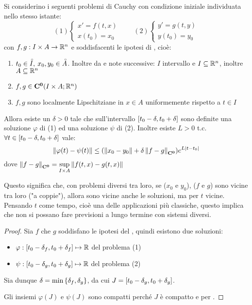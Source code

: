 \begin{theorem}
	\label{teo:cau_locale_part_2}
	Si considerino i seguenti problemi di Cauchy con condizione iniziale individuata nello stesso istante:
	$$(1)\begin{cases}x'=f(t,x)\\x(t_0)=x_0\end{cases}\qquad
	(2)\begin{cases}y'=g(t,y)\\y(t_0)=y_0\end{cases}$$
	con $f,g:I\times A \to \mathbb{R}^n$ e soddisfacenti le ipotesi di , cioè:
	\begin{enumerate}
		\item $t_0\in \accentset{\circ}{I},\:x_0,y_0\in \accentset{\circ}{A}$. Inoltre da  e note successive: $I$ intervallo e $I\subseteq \mathbb{R}^n$, inoltre $A\subseteq \mathbb{R}^n$
		\item $f,g\in \mathbf{C^{0}}(I\times A; \mathbb{R}^n)$
		\item $f,g$ sono localmente Lipschitziane in $x\in A$ uniformemente rispetto a $t\in I$
	\end{enumerate}
	Allora esiste un $\delta >0$ tale che sull'intervallo $\left[t_0-\delta,t_0+\delta\right]$ sono definite una soluzione $\varphi$ di (1) ed una soluzione $\psi$ di (2). Inoltre esiste $L>0$ t.c. $\forall t\in \left[t_0-\delta,t_0+\delta\right]$ vale:
	$$\left\|\varphi(t)-\psi(t)\right\| \le (\left\|x_0-y_0\right\|+\delta\left\|f-g\right\|_{\mathbf{C^{0}}})e^{L\left|t-t_0\right|}$$
	dove $\left\|f-g\right\|_{\mathbf{C^{0}}}=\sup\limits_{I\times A}\left\|f(t,x)-g(t,x)\right\|$
	\begin{note}
		Questo significa che, con problemi diversi tra loro, se ($x_0$ e $y_0$), ($f$ e $g$) sono vicine tra loro ("a coppie"), allora sono vicine anche le soluzioni, ma per $t$ vicine.
		Pensando $t$ come tempo, cioè una delle applicazioni più classiche, questo implica che non si possano fare previsioni a lungo termine con sistemi diversi.
	\end{note}
	\begin{proof}
		Sia $f$ che $g$ soddisfano le ipotesi del , quindi esistono due soluzioni:
		\begin{itemize}
			\item $\varphi:\left[t_0-\delta_f,t_0+\delta_f\right]\mapsto\mathbb{R}$ del problema (1)
			\item $\psi:\left[t_0-\delta_g,t_0+\delta_g\right]\mapsto\mathbb{R}$ del problema (2)
		\end{itemize}
		Sia dunque $\delta = \min\left\{\delta_f,\delta_g\right\}$, da cui $J=\left[t_0-\delta_g,t_0+\delta_g\right]$.

		Gli insiemi $\varphi(J)$ e $\psi(J)$ sono compatti perché $J$ è compatto e per .
	\end{proof}
\end{theorem}

